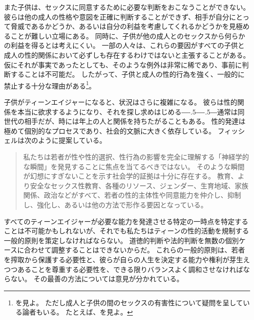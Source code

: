 \documentclass[paper=a4,book,openany]{jlreq}
\def\DDASH{―\kern-.5\zw―\kern-.5\zw―} %
\begin{document}
また子供は、セックスに同意するために必要な判断をおこなうことができない。
彼らは他の成人の性格や意図を正確に判断することができず、相手が自分にとって脅威であるかどうか、あるいは自分の利益を考慮してくれるかどうかを見極めることが難しい立場にある。
同時に、子供が他の成人とのセックスから何らかの利益を得るとは考えにくい。
一部の人々は、これらの要因がすべての子供と成人の性的関係において必ずしも存在するわけではないと主張することがある。
仮にそれが事実であったとしても、そのような例外は非常に稀であり、事前に判断することは不可能だ。
したがって、子供と成人の性的行為を強く、一般的に禁止する十分な理由がある\footnote{ \citet{malon15:_adult_child_sex_limit_liber_sexual_moral}を見よ。
ただし成人と子供の間のセックスの有害性について疑問を呈している論者もいる。
たとえば\citet{levine02:_harmf_minor}、\citet{brongersma90:_boy_lover_their_influen_boys}を見よ。
}。
\nocite{levine02:_harmf_minor} \nocite{brongersma90:_boy_lover_their_influen_boys}

子供がティーンエイジャーになると、状況はさらに複雑になる。
彼らは性的関係を本当に欲求するようになり、それを探し求めはじめる{\DDASH}通常は同世代の相手だが、時には年上の人と関係を持ちたがることもある。
性的発達は極めて個別的なプロセスであり、社会的文脈に大きく依存している。
フィッシェルは次のように提案している。

\begin{quote}
私たちは若者が性や性的選択、性行為の影響を完全に理解する「神経学的な瞬間」を発見することに焦点を当てるべきではない。
そのような瞬間が幻想にすぎないことを示す社会学的証拠は十分に存在する。
教育、より安全なセックス性教育、各種のリソース、ジェンダー、生育地域、家族関係、政治などがすべて、若者の性的主体性や同意能力を仲介し、抑制し、強化し、あるいは他の方法で形作る要因となっている。
\citep[p.305]{fischel10:_per_se_power}
\end{quote}

すべてのティーンエイジャーが必要な能力を発達させる特定の一時点を特定することは不可能かもしれないが、それでも私たちはティーンの性的活動を規制する一般的原則を策定しなければならない。
道徳的判断や法的判断を無数の個別ケースに合わせて調整することはできないからだ。
これらの一般的原則は、若者を搾取から保護する必要性と、彼らが自らの人生を決定する能力や権利が芽生えつつあることを尊重する必要性を、できる限りバランスよく調和させなければならない。
その最善の方法については意見が分かれている。
\end{document}
